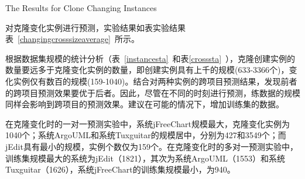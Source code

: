 {The Results for Clone Changing Instances}

对克隆变化实例进行预测，实验结果如表实验结果表~\ref{changingcrosssizeaverage}~所示。


根据数据集规模的统计分析（表~\ref{instancesta}~和表\ref{crosssta}~），克隆创建实例的数量要远多于克隆变化实例的数量，即创建实例具有上千的规模(633-3366个)，变化实例仅有数百的规模(159-1040)。结合对两种实例的跨项目预测结果，发现前者的跨项目预测效果要优于后者。因此，尽管在不同的时刻进行预测，练数据的规模同样会影响到跨项目的预测效果。建议在可能的情况下，增加训练集的数据。

在克隆变化时的一对一预测实验中，系统jFreeChart规模最大，克隆变化实例为1040个；系统ArgoUML和系统Tuxguitar的规模居中，分别为427和3549个；而jEdit具有最小的规模，实例个数仅为159个。在克隆变化时的多对一预测实验中，训练集规模最大的系统为jEdit（1821），其次为系统ArgoUML（1553）和系统Tuxguitar（1626），系统jFreeChart的训练集规模最小，为940。

